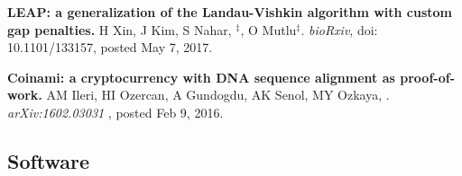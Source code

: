 \vspace{-.2cm}
 {\bf LEAP: a generalization of the Landau-Vishkin algorithm with custom gap penalties.}
 H Xin, J Kim, S Nahar, \calkan{}$^\ddag$, O Mutlu$^\ddag$.
{\it bioRxiv}, doi: 10.1101/133157, posted May 7, 2017.

\vspace{-.2cm}
 {\bf  Coinami: a cryptocurrency with DNA sequence alignment as proof-of-work.}
 AM Ileri, HI Ozercan, A Gundogdu, AK Senol, MY Ozkaya, \calkan{}.
{\it arXiv:1602.03031} , posted Feb 9, 2016.


\vspace{-.4cm}

\subsection{\small \sc Software}
